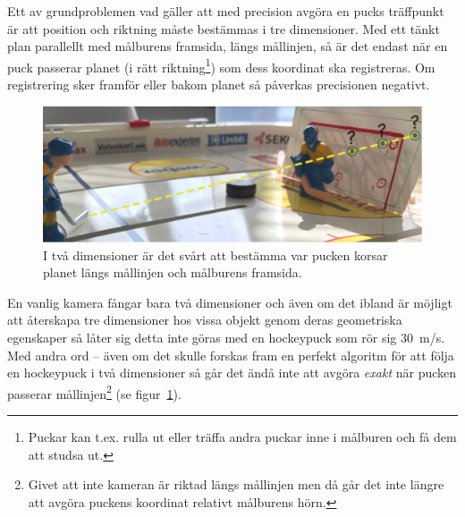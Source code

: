 \documentclass[a4paper,12pt]{article}
\begin{document}
Ett av grundproblemen vad gäller att med precision avgöra en pucks träffpunkt
är att position och riktning måste bestämmas i tre dimensioner. Med ett
tänkt plan parallellt med målburens framsida, längs mållinjen, så är det
endast när en puck passerar planet (i rätt riktning\footnote{Puckar kan t.ex.
rulla ut eller träffa andra puckar inne i målburen och få dem att studsa
ut.}) som dess koordinat ska registreras. Om registrering sker framför eller
bakom planet så påverkas precisionen negativt.

\begin{figure}[ht]
  \centering
  \includegraphics[width=\linewidth]{photos/3d-problem-two.jpg}
  \caption{I två dimensioner är det svårt att bestämma var pucken korsar
    planet längs mållinjen och målburens framsida.
  \label{fig:3d-problem2}}
\end{figure}

En vanlig kamera fångar bara två dimensioner och även om det ibland är möjligt
att återskapa tre dimensioner hos vissa objekt genom deras geometriska
egenskaper så låter sig detta inte göras med en hockeypuck som rör sig 30~m/s.
Med andra ord -- även om det skulle forskas fram en perfekt algoritm för att
följa en hockeypuck i två dimensioner så går det ändå inte att avgöra
\textit{exakt} när pucken passerar mållinjen\footnote{Givet att inte kameran
är riktad längs mållinjen men då går det inte längre att avgöra puckens
koordinat relativt målburens hörn.} (se figur~\ref{fig:3d-problem2}).
\end{document}
